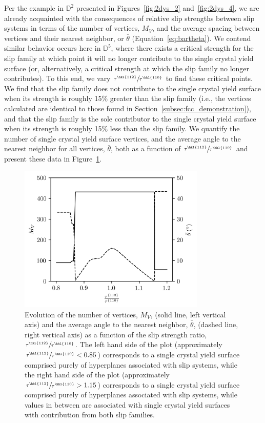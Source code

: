 \documentclass[preprint,3p,times,sort&compress,letterpaper,12pt]{elsarticle} %
\begin{document}
Per the example in $\mathbb{D}^2$ presented in Figures~\ref{fig:2dys_2} and~\ref{fig:2dys_4}, we are already acquainted with the consequences of relative slip strengths between slip systems in terms of the number of vertices, $M_V$, and the average spacing between vertices and their nearest neighbor, or $\bar{\theta}$ (Equation~\ref{eq:bartheta}). We contend similar behavior occurs here in $\mathbb{D}^5$, where there exists a critical strength for the  slip family at which point it will no longer contribute to the single crystal yield surface (or, alternatively, a critical strength at which the  slip family no longer contributes). To this end, we vary $\sfrac{\tau^{\hkl{1 1 2}}}{\tau^{\hkl{1 1 0}}}$ to find these critical points. We find that the  slip family does not contribute to the single crystal yield surface when its strength is roughly 15\% greater than the  slip family (i.e., the vertices calculated are identical to those found in Section~\ref{subsec:fcc_demonstration}), and that the  slip family is the sole contributor to the single crystal yield surface when its strength is roughly 15\% less than the  slip family. We quantify the number of single crystal yield surface vertices, and the average angle to the nearest neighbor for all vertices, $\bar{\theta}$, both as a function of $\sfrac{\tau^{\hkl{1 1 2}}}{\tau^{\hkl{1 1 0}}}$ and present these data in Figure~\ref{fig:bcc_112_trends}. 
\begin{figure}[H]
    \centering
    \includegraphics[width=3.5in]{bcc_112_trends.png}
    \caption{Evolution of the number of vertices, $M_V$, (solid line, left vertical axis) and the average angle to the nearest neighbor, $\bar{\theta}$, (dashed line, right vertical axis) as a function of the slip strength ratio, $\sfrac{\tau^{\hkl{1 1 2}}}{\tau^{\hkl{1 1 0}}}$. The left hand side of the plot (approximately $\sfrac{\tau^{\hkl{1 1 2}}}{\tau^{\hkl{1 1 0}}} < 0.85$) corresponds to a single crystal yield surface comprised purely of hyperplanes associated with  slip systems, while the right hand side of the plot (approximately $\sfrac{\tau^{\hkl{1 1 2}}}{\tau^{\hkl{1 1 0}}} > 1.15$) corresponds to a single crystal yield surface comprised purely of hyperplanes associated with  slip systems, while values in between are associated with single crystal yield surfaces with contribution from both slip families.}
    \label{fig:bcc_112_trends}
\end{figure}
\end{document}
